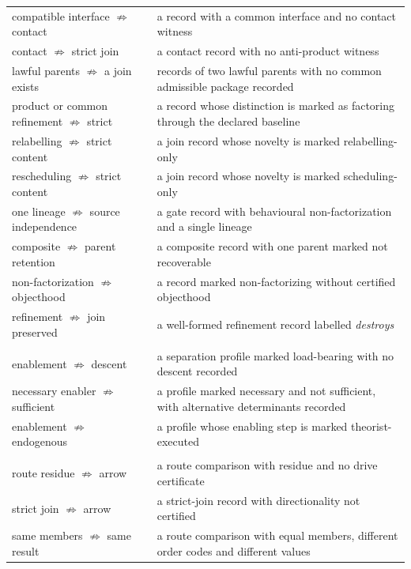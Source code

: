 {\begin{longtable}{@{}>{\raggedright\arraybackslash}p{5.6cm}>{\raggedright\arraybackslash}p{9.3cm}@{}}
compatible interface $\not\Rightarrow$ contact & a record with a common interface and no contact witness \\
contact $\not\Rightarrow$ strict join & a contact record with no anti-product witness \\
lawful parents $\not\Rightarrow$ a join exists & records of two lawful parents with no common admissible package recorded \\
product or common refinement $\not\Rightarrow$ strict & a record whose distinction is marked as factoring through the declared baseline \\
relabelling $\not\Rightarrow$ strict content & a join record whose novelty is marked relabelling-only \\
rescheduling $\not\Rightarrow$ strict content & a join record whose novelty is marked scheduling-only \\
one lineage $\not\Rightarrow$ source independence & a gate record with behavioural non-factorization and a single lineage \\
composite $\not\Rightarrow$ parent retention & a composite record with one parent marked not recoverable \\
non-factorization $\not\Rightarrow$ objecthood & a record marked non-factorizing without certified objecthood \\
refinement $\not\Rightarrow$ join preserved & a well-formed refinement record labelled \emph{destroys} \\
\midrule
\multicolumn{2}{@{}l}{\emph{Enablement and descent}}\\
enablement $\not\Rightarrow$ descent & a separation profile marked load-bearing with no descent recorded \\
necessary enabler $\not\Rightarrow$ sufficient & a profile marked necessary and not sufficient, with alternative determinants recorded \\
enablement $\not\Rightarrow$ endogenous & a profile whose enabling step is marked theorist-executed \\
\midrule
\multicolumn{2}{@{}l}{\emph{Dynamics and residue}}\\
route residue $\not\Rightarrow$ arrow & a route comparison with residue and no drive certificate \\
strict join $\not\Rightarrow$ arrow & a strict-join record with directionality not certified \\
same members $\not\Rightarrow$ same result & a route comparison with equal members, different order codes and different values \\

\end{longtable}}
